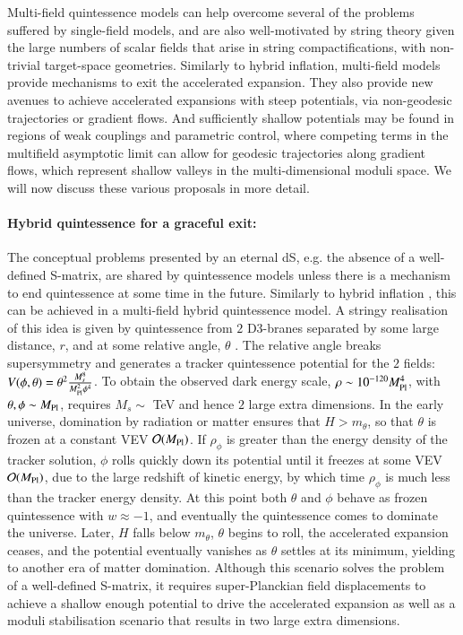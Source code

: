 Multi-field quintessence models can help overcome several of the problems suffered by single-field models, and are also well-motivated by string theory given the large numbers of scalar fields that arise in string compactifications, with non-trivial target-space geometries. Similarly to hybrid inflation, multi-field models provide mechanisms to exit the accelerated expansion. They also provide new avenues to achieve accelerated expansions with steep potentials, via non-geodesic trajectories or gradient flows. And sufficiently shallow potentials may be found in regions of weak couplings and parametric control, where competing terms in the multifield asymptotic limit can allow for geodesic trajectories along gradient flows, which represent shallow valleys in the multi-dimensional moduli space. We will now discuss these various proposals in more detail.

\paragraph{Hybrid quintessence for a graceful exit:}

The conceptual problems presented by an eternal dS, e.g. the absence of a well-defined S-matrix, are shared by quintessence models \cite{Hellerman:2001yi, Fischler:2001yj} unless there is a mechanism to end quintessence at some time in the future. Similarly to hybrid inflation \cite{Linde:1993cn}, this can be achieved in a multi-field hybrid quintessence model. A stringy realisation of this idea is given by quintessence from $2$ D3-branes separated by some large distance, $r$, and at some relative angle, $\theta$ \cite{Halyo:2001fb}. The relative angle breaks supersymmetry and generates a tracker quintessence potential for the $2$ fields: $V(\phi,\theta) = \theta^2 \frac{M_s^8}{M_{\rm Pl}^2 \phi^4}$. To obtain the observed dark energy scale, $\rho \sim 10^{-120}M_{\rm Pl}^4$, with $\theta, \phi \sim M_{\rm Pl}$, requires $M_s \sim$ TeV and hence $2$ large extra dimensions.  In the early universe, domination by radiation or matter ensures that $H>m_\theta$, so that $\theta$ is frozen at a constant VEV $\mathcal{O}(M_{\rm Pl})$.  If $\rho_\phi$ is greater than the energy density of the tracker solution, $\phi$ rolls quickly down its potential until it freezes at some VEV $\mathcal{O}(M_{\rm Pl})$, due to the large redshift of kinetic energy, by which time $\rho_\phi$ is much less than the tracker energy density. At this point both $\theta$ and $\phi$ behave as frozen quintessence with $w\approx -1$, and eventually the quintessence comes to dominate the universe. Later, $H$ falls below $m_\theta$, $\theta$ begins to roll, the accelerated expansion ceases, and the potential eventually vanishes as $\theta$ settles at its minimum, yielding to another era of matter domination. Although this scenario solves the problem of a well-defined S-matrix, it requires super-Planckian field displacements to achieve a shallow enough potential to drive the accelerated expansion as well as a moduli stabilisation scenario that results in two large extra dimensions.

